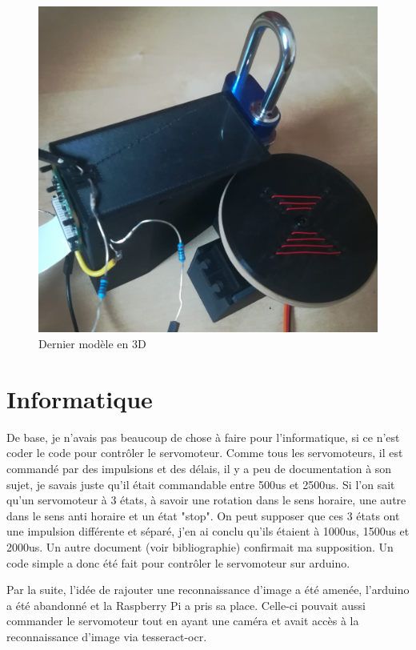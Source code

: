 \documentclass[twoside]{article}
\begin{document}
\begin{multicols}{2}
\begin{figure}[H]
\centering
\includegraphics[scale=0.1]{modelefinalirl.jpg}
\caption{Dernier modèle en 3D}
\end{figure}


\section{Informatique}

De base, je n'avais pas beaucoup de chose à faire pour l'informatique, si ce n'est coder le code pour contrôler le servomoteur. Comme tous les servomoteurs, il est commandé par des impulsions et des délais, il y a peu de documentation à son sujet, je savais juste qu'il était commandable entre 500us et 2500us. Si l'on sait qu'un servomoteur à 3 états, à savoir une rotation dans le sens horaire, une autre dans le sens anti horaire et un état "stop". On peut supposer que ces 3 états ont une impulsion différente et séparé, j'en ai conclu qu'ils étaient à 1000us, 1500us et 2000us. Un autre document (voir bibliographie) confirmait ma supposition. Un code simple a donc été fait pour contrôler le servomoteur sur arduino.

Par la suite, l'idée de rajouter une reconnaissance d'image a été amenée, l'arduino a été abandonné et la Raspberry Pi a pris sa place. Celle-ci pouvait aussi commander le servomoteur tout en ayant une caméra et avait accès à la reconnaissance d'image via tesseract-ocr.


\end{multicols}
\end{document}
